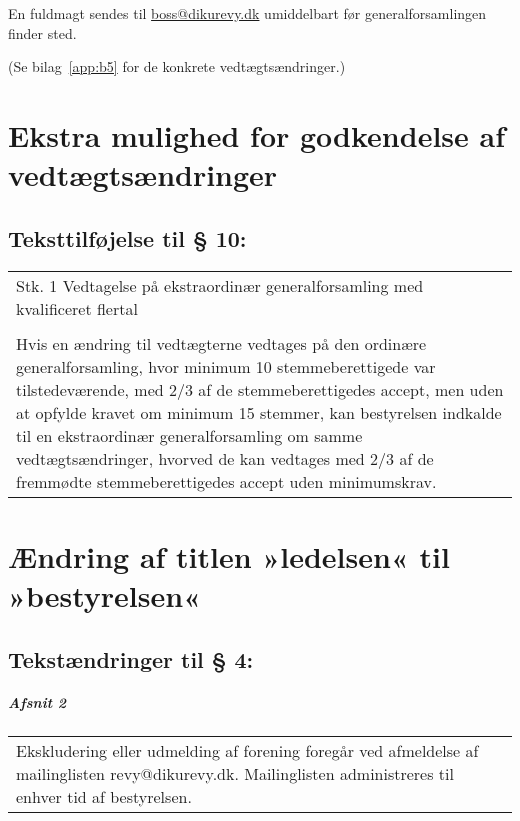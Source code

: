 \documentclass[a4paper,11pt]{report}
\newenvironment{quotationb}%
{\begin{tabular}{|p{10cm}}}%
{\\\end{tabular}}
\begin{document}
En fuldmagt sendes til \url{boss@dikurevy.dk} umiddelbart før
generalforsamlingen finder sted.

(Se bilag~\ref{app:b5} for de konkrete vedtægtsændringer.)

\newpage

\begin{appendices}
\chapter{Ekstra mulighed for godkendelse af vedtægtsændringer}
\label{app:b1}

\section*{Teksttilføjelse til § 10:}

\begin{quotationb}
Stk. 1 Vedtagelse på ekstraordinær generalforsamling med kvalificeret flertal\\
\\
Hvis en ændring til vedtægterne vedtages på den ordinære generalforsamling,
hvor minimum 10 stemmeberettigede var tilstedeværende, med 2/3 af de
stemmeberettigedes accept, men uden at opfylde kravet om minimum 15 stemmer,
kan bestyrelsen indkalde til en ekstraordinær generalforsamling om samme
vedtægtsændringer, hvorved de kan vedtages med 2/3 af de fremmødte
stemmeberettigedes accept uden minimumskrav.
\end{quotationb}

\chapter{Ændring af titlen »ledelsen« til »bestyrelsen«}
\label{app:b2}

\section*{Tekstændringer til § 4:}

\paragraph{Afsnit 2}

\begin{quotationb}
Ekskludering eller udmelding af forening foregår ved afmeldelse af mailinglisten
revy@dikurevy.dk.  Mailinglisten administreres til enhver tid af bestyrelsen.
\end{quotationb}


\end{appendices}
\end{document}
